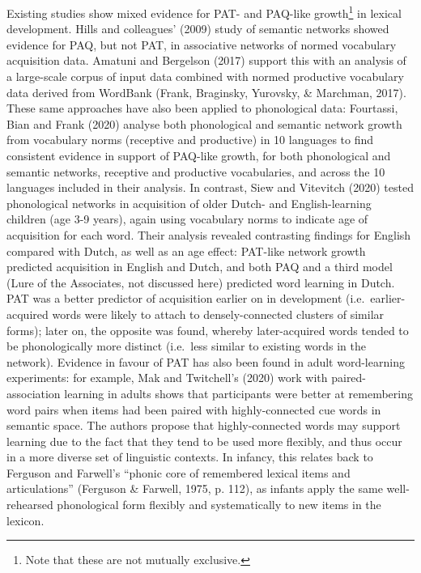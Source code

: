 \documentclass[
  man]{apa6}
\begin{document}
Existing studies show mixed evidence for PAT- and PAQ-like growth\footnote{Note that these are not mutually exclusive.} in lexical development. Hills and colleagues' (2009) study of semantic networks showed evidence for PAQ, but not PAT, in associative networks of normed vocabulary acquisition data. Amatuni and Bergelson (2017) support this with an analysis of a large-scale corpus of input data combined with normed productive vocabulary data derived from WordBank (Frank, Braginsky, Yurovsky, \& Marchman, 2017). These same approaches have also been applied to phonological data: Fourtassi, Bian and Frank (2020) analyse both phonological and semantic network growth from vocabulary norms (receptive and productive) in 10 languages to find consistent evidence in support of PAQ-like growth, for both phonological and semantic networks, receptive and productive vocabularies, and across the 10 languages included in their analysis. In contrast, Siew and Vitevitch (2020) tested phonological networks in acquisition of older Dutch- and English-learning children (age 3-9 years), again using vocabulary norms to indicate age of acquisition for each word. Their analysis revealed contrasting findings for English compared with Dutch, as well as an age effect: PAT-like network growth predicted acquisition in English and Dutch, and both PAQ and a third model (Lure of the Associates, not discussed here) predicted word learning in Dutch. PAT was a better predictor of acquisition earlier on in development (i.e.~earlier-acquired words were likely to attach to densely-connected clusters of similar forms); later on, the opposite was found, whereby later-acquired words tended to be phonologically more distinct (i.e.~less similar to existing words in the network). Evidence in favour of PAT has also been found in adult word-learning experiments: for example, Mak and Twitchell's (2020) work with paired-association learning in adults shows that participants were better at remembering word pairs when items had been paired with highly-connected cue words in semantic space. The authors propose that highly-connected words may support learning due to the fact that they tend to be used more flexibly, and thus occur in a more diverse set of linguistic contexts. In infancy, this relates back to Ferguson and Farwell's ``phonic core of remembered lexical items and articulations'' (Ferguson \& Farwell, 1975, p. 112), as infants apply the same well-rehearsed phonological form flexibly and systematically to new items in the lexicon.
\end{document}
